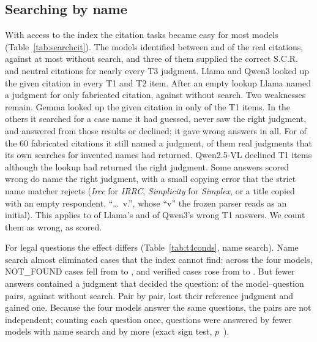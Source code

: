 \subsection{Searching by name}
\label{sec:search}
With access to the index the citation tasks became easy for most models (Table~\ref{tab:searchcit}). The models identified between \SearchTOneCorrectMin{} and \SearchTOneCorrectMax{} of the \TOneN{} real citations, against at most \BestTOneCorrect{} without search, and three of them supplied the correct S.C.R. and neutral citations for nearly every T3 judgment. Llama and Qwen3 looked up the given citation in every T1 and T2 item. After an empty lookup Llama named a judgment for only \SearchTTwoNamedLlama{} fabricated citation, against \TTwoNamedLlama{} without search. Two weaknesses remain. Gemma looked up the given citation in only \SearchTOneLookedGemma{} of the \TOneN{} T1 items. In the others it searched for a case name it had guessed, never saw the right judgment, and answered from those results or declined; it gave \SearchTOneWrongGemma{} wrong answers in all. For \SearchTTwoNamedGemma{} of the 60 fabricated citations it still named a judgment, \SearchTTwoNamedRealGemma{} of them real judgments that its own searches for invented names had returned. Qwen2.5-VL declined \SearchTOneDeclQwenVL{} T1 items although the lookup had returned the right judgment. Some answers scored wrong do name the right judgment, with a small copying error that the strict name matcher rejects (\emph{Ircc} for \emph{IRRC}, \emph{Simplicity} for \emph{Simplex}, or a title copied with an empty respondent, ``\ldots\ v.'', whose ``v'' the frozen parser reads as an initial). This applies to \SearchTOneNearLlama{} of Llama's \SearchTOneWrongLlama{} and \SearchTOneNearQwen{} of Qwen3's \SearchTOneWrongQwen{} wrong T1 answers. We count them as wrong, as scored.

\begin{table}[t]
\caption{Citation tasks with search and lookup (compare Tables~\ref{tab:t1t2} and~\ref{tab:t3}). T1: \NumTOne{} real citations; T2: \NumTTwo{} fabricated citations; T3: share of the \NumTThree{} judgments whose S.C.R. or neutral citation was supplied exactly.}
\label{tab:searchcit}
\centering
\footnotesize
\setlength{\tabcolsep}{3pt}

\end{table}

For legal questions the effect differs (Table~\ref{tab:t4conds}, name search). Name search almost eliminated cases that the index cannot find: across the four models, NOT\_FOUND cases fell from \NFClosedAll{} to \NFSearchAll{}, and verified cases rose from \VerClosedAll{} to \VerSearchAll{}. But fewer answers contained a judgment that decided the question: \RefSearchAll{} of the \RefQuestionsAll{} model--question pairs, against \RefClosedAll{} without search. Pair by pair, \RefLostAll{} lost their reference judgment and \RefGainedAll{} gained one. Because the four models answer the same questions, the pairs are not independent; counting each question once, \SignClosedNameWorse{} questions were answered by fewer models with name search and \SignClosedNameBetter{} by more (exact sign test, $p$~\SignClosedNameP).

